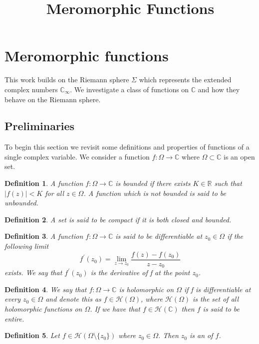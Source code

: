 \documentclass{article}
\title{Meromorphic Functions}
\date{}
\newtheorem*{definition}{Definition}
\begin{document}
\section*{Meromorphic functions}
This work builds on the Riemann sphere $\Sigma$ which represents the extended complex numbers $\mathbb{C}_{\infty}$. We investigate a class of functions on $\mathbb{C}$ and how they behave on the Riemann sphere.

\subsection*{Preliminaries}
To begin this section we revisit some definitions and properties of functions of a single complex variable. We consider a function $f:\Omega\to\mathbb{C}$ where $\Omega\subset\mathbb{C}$ is an open set.
\begin{definition}
A function $f:\Omega\to\mathbb{C}$ is bounded if there exists $K\in\mathbb{R}$ such that $|f(z)|<K$ for all $z\in\Omega$. A function which is not bounded is said to be unbounded.
\end{definition}

\begin{definition}
A set is said to be compact if it is both closed and bounded.
\end{definition}

\begin{definition}
A function $f:\Omega\to\mathbb{C}$ is said to be differentiable at $z_{0}\in\Omega$ if the following limit $$f^{'}(z_{0})=\lim_{z\to z_{0}}\frac{f(z)-f(z_{0})}{z-z_{0}}$$ exists. We say that $f^{'}(z_{0})$ is the derivative of f at the point $z_{0}$.
\end{definition}

\begin{definition}
We say that $f:\Omega\to\mathbb{C}$ is holomorphic on $\Omega$ if f is differentiable at every $z_{0}\in\Omega$ and denote this as $f\in\mathcal{H}(\Omega)$, where $\mathcal{H}(\Omega)$ is the set of all holomorphic functions on $\Omega$. If we have that $f\in\mathcal{H}(\mathbb{C})$ then $f$ is said to be entire.
\end{definition}

\begin{definition}
Let $f\in\mathcal{H}(\Omega\setminus\{z_{0}\})$ where $z_{0}\in\Omega$. Then $z_{0}$ is an  of $f$.\cite[p.~47]{CAaRS} 
\end{definition}
\end{document}
